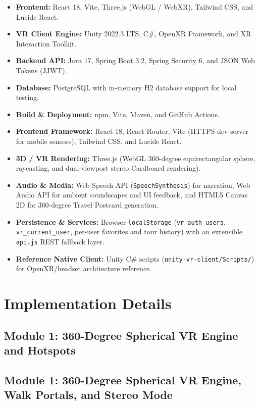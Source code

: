 \documentclass{tietreport}
\begin{document}
\begin{itemize}
  \item \textbf{Frontend:} React 18, Vite, Three.js (WebGL / WebXR), Tailwind CSS, and Lucide React.
  \item \textbf{VR Client Engine:} Unity 2022.3 LTS, C\#, OpenXR Framework, and XR Interaction Toolkit.
  \item \textbf{Backend API:} Java 17, Spring Boot 3.2, Spring Security 6, and JSON Web Tokens (JJWT).
  \item \textbf{Database:} PostgreSQL with in-memory H2 database support for local testing.
  \item \textbf{Build \& Deployment:} npm, Vite, Maven, and GitHub Actions.
  \item \textbf{Frontend Framework:} React 18, React Router, Vite (HTTPS dev server for mobile sensors), Tailwind CSS, and Lucide React.
  \item \textbf{3D / VR Rendering:} Three.js (WebGL 360-degree equirectangular sphere, raycasting, and dual-viewport stereo Cardboard rendering).
  \item \textbf{Audio \& Media:} Web Speech API (\texttt{SpeechSynthesis}) for narration, Web Audio API for ambient soundscapes and UI feedback, and HTML5 Canvas 2D for 360-degree Travel Postcard generation.
  \item \textbf{Persistence \& Services:} Browser \texttt{localStorage} (\texttt{vr\_auth\_users}, \texttt{vr\_current\_user}, per-user favorites and tour history) with an extensible \texttt{api.js} REST fallback layer.
  \item \textbf{Reference Native Client:} Unity C\# scripts (\texttt{unity-vr-client/Scripts/}) for OpenXR/headset architecture reference.
\end{itemize}

\section{Implementation Details}

\subsection{Module 1: 360-Degree Spherical VR Engine and Hotspots}
\subsection{Module 1: 360-Degree Spherical VR Engine, Walk Portals, and Stereo Mode}
\end{document}
